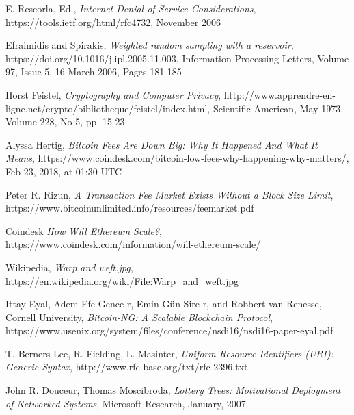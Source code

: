 \documentclass{article}
\begin{document}
\begin{thebibliography}{1}
    E. Rescorla, Ed.,
    \textit{Internet Denial-of-Service Considerations},
    https://tools.ietf.org/html/rfc4732,
    November 2006

    Efraimidis and Spirakis,
    \textit{Weighted random sampling with a reservoir},
    https://doi.org/10.1016/j.ipl.2005.11.003,
    Information Processing Letters,
    Volume 97, Issue 5, 16 March 2006, Pages 181-185

    Horst Feistel,
    \textit{Cryptography and Computer Privacy},
    http://www.apprendre-en-ligne.net/crypto/bibliotheque/feistel/index.html,
    Scientific American, May 1973, Volume 228, No 5, pp. 15-23

    Alyssa Hertig,
    \textit{Bitcoin Fees Are Down Big: Why It Happened And What It Means},
    https://www.coindesk.com/bitcoin-low-fees-why-happening-why-matters/,
    Feb 23, 2018, at 01:30 UTC

    Peter R. Rizun,
    \textit{A Transaction Fee Market Exists Without a Block Size Limit},
    https://www.bitcoinunlimited.info/resources/feemarket.pdf

    Coindesk
    \textit{How Will Ethereum Scale?},
    https://www.coindesk.com/information/will-ethereum-scale/

    Wikipedia,
    \textit{Warp and weft.jpg},
    https://en.wikipedia.org/wiki/File:Warp\_and\_weft.jpg

    Ittay Eyal, Adem Efe Gence r, Emin Gün Sire r, and Robbert van Renesse, Cornell University,
    \textit{Bitcoin-NG: A Scalable Blockchain Protocol},
    https://www.usenix.org/system/files/conference/nsdi16/nsdi16-paper-eyal.pdf

    T. Berners-Lee, R. Fielding, L. Masinter,
    \textit{Uniform Resource Identifiers (URI): Generic Syntax},
    http://www.rfc-base.org/txt/rfc-2396.txt

    John R. Douceur, Thomas Moscibroda,
    \textit{Lottery Trees: Motivational Deployment of Networked Systems},
    Microsoft Research, January, 2007



\end{thebibliography}
\end{document}
